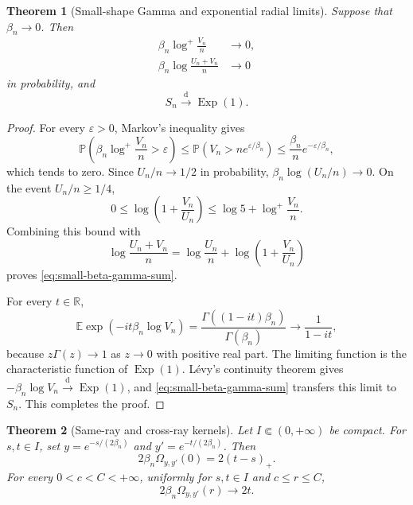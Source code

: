 \documentclass[10pt,a4paper]{amsart}
\numberwithin{equation}{section}
\newtheorem{theorem}{Theorem}[section]
\newcommand{\R}{\mathbb R}
\DeclareMathOperator{\Exp}{Exp}
\newcommand{\eps}{\varepsilon}
\begin{document}
\begin{theorem}[Small-shape Gamma and exponential radial limits]\label{thm:small-beta-radial}
Suppose that $\beta_n\to0$.  Then
\begin{align}
\beta_n\log^+\frac{V_n}{n}&\longrightarrow0, \label{eq:small-beta-upper-gamma}\\
\beta_n\log\frac{U_n+V_n}{n}&\longrightarrow0 \label{eq:small-beta-gamma-sum}
\end{align}
in probability, and
\begin{equation}\label{eq:Sn-exp} S_n\overset{\mathrm{d}}{\longrightarrow}\Exp(1). \end{equation}
\end{theorem}

\begin{proof}
For every $\eps>0$, Markov's inequality gives
\[ \mathbb P\left(\beta_n\log^+\frac{V_n}{n}>\eps\right) \le\mathbb P\left(V_n>ne^{\eps/\beta_n}\right) \le\frac{\beta_n}{n}e^{-\eps/\beta_n}, \]
which tends to zero.  Since $U_n/n\to1/2$ in probability,
$\beta_n\log(U_n/n)\to0$.  On the event $U_n/n\ge1/4$,
\[ 0\le\log\left(1+\frac{V_n}{U_n}\right) \le\log5+\log^+\frac{V_n}{n}. \]
Combining this bound with
\[ \log\frac{U_n+V_n}{n} =\log\frac{U_n}{n} +\log\left(1+\frac{V_n}{U_n}\right) \]
proves \eqref{eq:small-beta-gamma-sum}.

For every $t\in\R$,
\[ \mathbb E\exp(-it\beta_n\log V_n) =\frac{\Gamma((1-it)\beta_n)}{\Gamma(\beta_n)} \longrightarrow\frac1{1-it}, \]
because $z\Gamma(z)\to1$ as $z\to0$ with positive real part.  The limiting function is the characteristic function of $\Exp(1)$.  L\'evy's continuity theorem gives $-\beta_n\log V_n\overset{\mathrm{d}}{\longrightarrow}\Exp(1)$, and \eqref{eq:small-beta-gamma-sum} transfers this limit to $S_n$.  This completes the proof.
\end{proof}

\begin{theorem}[Same-ray and cross-ray kernels]\label{thm:small-beta-kernels}
Let $I\Subset(0,+\infty)$ be compact.  For $s,t\in I$, set
$y=e^{-s/(2\beta_n)}$ and $y'=e^{-t/(2\beta_n)}$.  Then
\begin{equation}\label{eq:small-same-ray} 2\beta_n\Omega_{y,y'}(0)=2(t-s)_+. \end{equation}
For every $0<c<C<+\infty$, uniformly for $s,t\in I$ and $c\le r\le C$,
\begin{equation}\label{eq:small-cross} 2\beta_n\Omega_{y,y'}(r)\longrightarrow2t. \end{equation}
\end{theorem}
\end{document}
